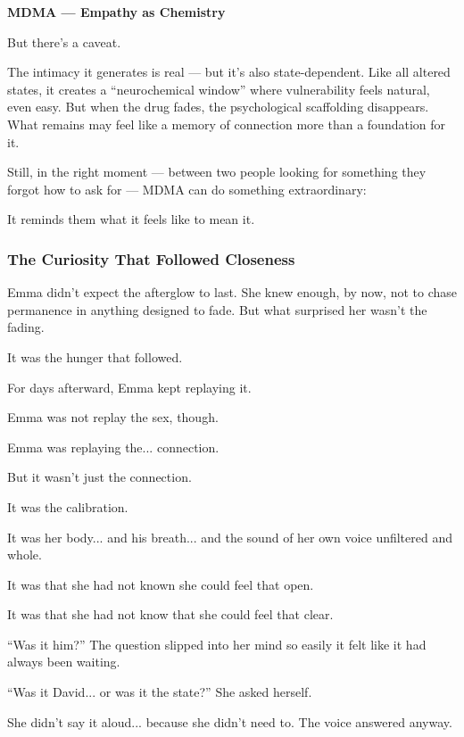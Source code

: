 \begin{TechnicalSidebar}{\textbf{MDMA — Empathy as Chemistry}}
  \medskip
  
  But there’s a caveat.

  \medskip
  
  The intimacy it generates is real — but it’s also state-dependent. Like all altered states, it creates a “neurochemical window” where vulnerability feels natural, even easy. But when the drug fades, the psychological scaffolding disappears. What remains may feel like a memory of connection more than a foundation for it.
  
  \medskip
  
  Still, in the right moment — between two people looking for something they forgot how to ask for — MDMA can do something extraordinary:
  
  \medskip
  
  It reminds them what it feels like to mean it.
  
\end{TechnicalSidebar}


\subsubsection{The Curiosity That Followed Closeness}

Emma didn’t expect the afterglow to last. She knew enough, by now, not to chase permanence in anything designed to fade. But what surprised her wasn’t the fading.

It was the hunger that followed.

For days afterward, Emma kept replaying it.  

Emma was not replay the sex, though. 

Emma was replaying the... connection.

But it wasn’t just the connection. 

It was the calibration. 

It was her body... and his breath... and the sound of her own voice unfiltered and whole. 

It was that she had not known she could feel that open. 

It was that she had not know that she could feel that clear.

``Was it him?'' The question slipped into her mind so easily it felt like it had always been waiting. 

``Was it David... or was it the state?'' She asked herself. 

She didn’t say it aloud... because she didn’t need to. The voice answered anyway.

